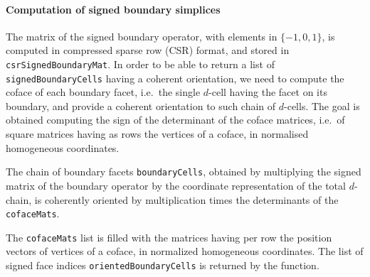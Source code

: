 \documentclass[11pt,oneside]{article}	%
\begin{document}
\paragraph{Computation of signed boundary simplices}

The matrix of the signed boundary operator, with elements in $\{-1,0,1\}$, is computed in compressed sparse row (CSR) format, and stored in \texttt{csrSignedBoundaryMat}. In order to be able to return a list of \texttt{signedBoundaryCells} having a coherent orientation, we need to compute the coface of each boundary facet, i.e.~the single $d$-cell having the facet on its boundary, and provide a coherent orientation to such chain of $d$-cells. The goal is obtained computing the sign of the determinant of the coface matrices, i.e.~of square matrices having as rows the vertices of a coface, in normalised homogeneous coordinates.

The chain of boundary facets \texttt{boundaryCells}, obtained by multiplying the signed matrix of the boundary operator by the coordinate representation of the total $d$-chain, is coherently oriented by multiplication times the determinants of the \texttt{cofaceMats}.

The \texttt{cofaceMats} list is filled 
with the matrices having per row the position vectors of vertices of a coface, in normalized 
homogeneous coordinates. The list of signed face indices \texttt{orientedBoundaryCells} is returned by the function.
\end{document}
